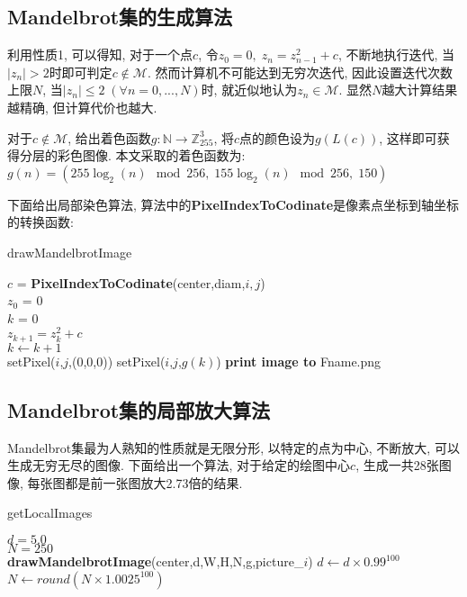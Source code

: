 \documentclass[UTF8]{ctexart}
\begin{document}
\subsection{Mandelbrot集的生成算法}

利用性质1, 可以得知, 对于一个点$c$, 令$z_0=0,\;z_n=z_{n-1}^2+c$, 不断地执行迭代, 当$|z_n|>2$时即可判定$c\notin \mathcal{M}$. 然而计算机不可能达到无穷次迭代, 因此设置迭代次数上限$N$, 当$|z_n|\leq 2\;(\forall n=0,...,N)$时, 就近似地认为$z_n\in \mathcal{M}$. 显然$N$越大计算结果越精确, 但计算代价也越大. 

对于$c\notin \mathcal{M}$, 给出着色函数$g:\mathbb{N} \to \mathbb{Z}_{255}^3$, 将$c$点的颜色设为$g(L(c))$, 这样即可获得分层的彩色图像. 本文采取的着色函数为: $g(n)=(255\log_2(n)\mod 256,\;155\log_2(n)\mod 256,\;150)$

下面给出局部染色算法, 算法中的\textbf{PixelIndexToCodinate}是像素点坐标到轴坐标的转换函数: 

\begin{algorithm}[H]
	\caption{drawMandelbrotImage}
	\small
	
	{
        {
            $c$ = \textbf{PixelIndexToCodinate}(center,diam,$i,j$)\\
            $z_0$ = 0\\
            $k$ = 0\\
            {
                $z_{k+1}=z_k^2+c$\\
                $k\gets k+1$\\
            }
            {
                setPixel($i$,$j$,(0,0,0))
            }
            {
                setPixel($i$,$j$,$g(k)$)
            }
        }
	}
    \textbf{print image to} Fname.png
\end{algorithm}

\subsection{Mandelbrot集的局部放大算法}

Mandelbrot集最为人熟知的性质就是无限分形, 以特定的点为中心, 不断放大, 可以生成无穷无尽的图像. 下面给出一个算法, 对于给定的绘图中心$c$, 生成一共28张图像, 每张图都是前一张图放大2.73倍的结果. 

\begin{algorithm}[H]
	\caption{getLocalImages}
	\small
	
    $d=5.0$\\
    $N=250$\\
	{
        \textbf{drawMandelbrotImage}(center,d,W,H,N,g,picture\_$i$)
        $d\gets d \times 0.99^100$
        $N\gets round(N \times 1.0025^100)$
	}
\end{algorithm}
\end{document}
